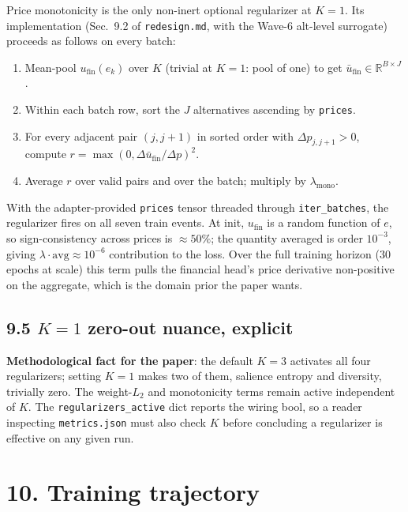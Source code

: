 \documentclass[11pt,a4paper]{article}
\begin{document}
Price monotonicity is the only non-inert optional regularizer at
$K = 1$. Its implementation (Sec.~9.2 of \texttt{redesign.md}, with
the Wave-6 alt-level surrogate) proceeds as follows on every batch:
\begin{enumerate}
\item Mean-pool $u_{\text{fin}}(e_k)$ over $K$ (trivial at $K = 1$:
pool of one) to get $\bar{u}_{\text{fin}} \in \mathbb{R}^{B \times J}$.
\item Within each batch row, sort the $J$ alternatives ascending by
\texttt{prices}.
\item For every adjacent pair $(j, j+1)$ in sorted order with
$\Delta p_{j, j+1} > 0$, compute
$r = \max(0, \Delta \bar{u}_{\text{fin}} / \Delta p)^2$.
\item Average $r$ over valid pairs and over the batch; multiply by
$\lambda_{\text{mono}}$.
\end{enumerate}
With the adapter-provided \texttt{prices} tensor threaded through
\texttt{iter\_batches}, the regularizer fires on all seven train
events. At init, $u_{\text{fin}}$ is a random function of $e$, so
sign-consistency across prices is $\approx 50\%$; the quantity
averaged is order $10^{-3}$, giving $\lambda \cdot \text{avg} \approx
10^{-6}$ contribution to the loss. Over the full training horizon
(30 epochs at scale) this term pulls the financial head's price
derivative non-positive on the aggregate, which is the domain prior
the paper wants.

\subsection*{9.5 $K = 1$ zero-out nuance, explicit}

\textbf{Methodological fact for the paper}: the default $K = 3$
activates all four regularizers; setting $K = 1$ makes two of them,
salience entropy and diversity, trivially zero. The weight-$L_2$ and
monotonicity terms remain active independent of $K$. The
\texttt{regularizers\_active} dict reports the wiring bool, so a
reader inspecting \texttt{metrics.json} must also check $K$ before
concluding a regularizer is effective on any given run.

\section*{10. Training trajectory}
\end{document}
